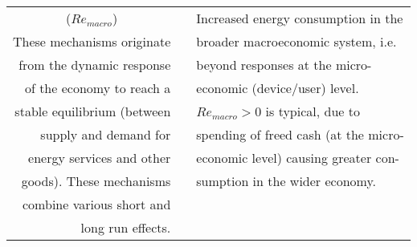 \begin{table}
\begin{center}
\begin{tabular}{ r l l }
\multicolumn{1}{c}{($Re_{macro}$)} &                                              & Increased energy consumption in the  \\
These mechanisms originate         &                                              & broader macroeconomic system, i.e.\  \\
from the dynamic response          &                                              & beyond responses at the micro-  \\
of the economy to reach a          &                                              & economic (device/user) level. \\
stable equilibrium (between        &                                              & $Re_{macro} > 0$ is typical, due to   \\
supply and demand for              &                                              & spending of freed cash (at the micro-\\
energy services and other          &                                              & economic level) causing greater con- \\
goods). These mechanisms           &                                              & sumption in the wider economy. \\
combine various short and          &                                              &  \\
long run effects.                  &                                              &  \\
\bottomrule
\end{tabular}
\end{center}
\end{table}